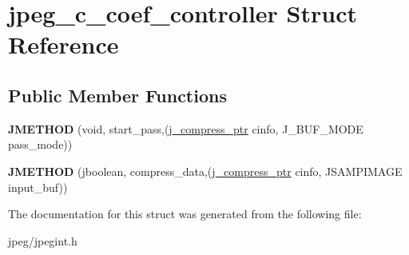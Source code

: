 \hypertarget{structjpeg__c__coef__controller}{}\section{jpeg\+\_\+c\+\_\+coef\+\_\+controller Struct Reference}
\label{structjpeg__c__coef__controller}
\subsection*{Public Member Functions}
\begin{DoxyCompactItemize}
\item 
{\bfseries J\+M\+E\+T\+H\+OD} (void, start\+\_\+pass,(\hyperlink{structjpeg__compress__struct}{j\+\_\+compress\+\_\+ptr} cinfo, J\+\_\+\+B\+U\+F\+\_\+\+M\+O\+DE pass\+\_\+mode))\hypertarget{structjpeg__c__coef__controller_a975b8ac2bcd4ea8065eb676ea805d78e}{}\label{structjpeg__c__coef__controller_a975b8ac2bcd4ea8065eb676ea805d78e}

\item 
{\bfseries J\+M\+E\+T\+H\+OD} (jboolean, compress\+\_\+data,(\hyperlink{structjpeg__compress__struct}{j\+\_\+compress\+\_\+ptr} cinfo,   J\+S\+A\+M\+P\+I\+M\+A\+GE input\+\_\+buf))\hypertarget{structjpeg__c__coef__controller_a48b653a49133f1fb823e469ca8ee25b8}{}\label{structjpeg__c__coef__controller_a48b653a49133f1fb823e469ca8ee25b8}

\end{DoxyCompactItemize}


The documentation for this struct was generated from the following file\+:\begin{DoxyCompactItemize}
\item 
jpeg/jpegint.\+h\end{DoxyCompactItemize}
